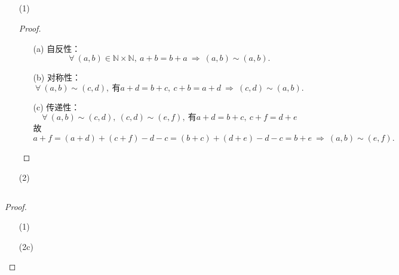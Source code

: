 \documentclass[UTF8]{ctexart}
\begin{document}
\subsection{}   %
\begin{enumerate}
    \item [(1)]
    \begin{proof}
        \begin{enumerate}
            \item [(a)]自反性：
            \[
                \forall\ (a,b)\in \mathbb{N}\times \mathbb{N},\ 
                a+b = b+a\ \Rightarrow\ (a,b)\sim (a,b).    
            \]
            \item [(b)]对称性：
            \[
                \forall\ (a,b)\sim (c,d),\ \mbox{有}
                a+d = b+c,\ c+b = a+d
                \ \Rightarrow\ 
                (c,d)\sim (a,b).    
            \]
            \item [(c)]传递性：
            \[
                \forall\ (a,b)\sim (c,d),\ (c,d)\sim (e,f),\ \mbox{有}
                a+d = b+c,\ c+f = d+e
            \]
            故
            \[
                a+f = (a+d)+(c+f)-d-c = (b+c)+(d+e)-d-c = b+e
                \ \Rightarrow\ 
                (a,b)\sim (e,f).
            \]
        \end{enumerate}
    \end{proof}
    \item [(2)]
\end{enumerate}

\subsection{}   %
\begin{proof}
    \begin{enumerate}
        \item []
        \item [(1)]
        \item [(2c)]
    \end{enumerate}
\end{proof}


\subsection{}   %



\subsection{}   %
\end{document}

